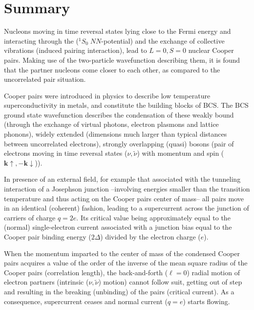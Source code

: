  \section{Summary}
Nucleons moving in time reversal states lying close to the Fermi energy and interacting through the  ($^1S_0\;NN$-potential) and the exchange of collective vibrations (induced pairing interaction), lead to $L=0, S=0$ nuclear Cooper pairs. Making use of the two-particle wavefunction describing them, it is found that the partner nucleons come closer to each other, as compared to the uncorrelated pair situation.

Cooper pairs were introduced in physics to describe low temperature superconductivity in metals, and constitute the building blocks of BCS. The BCS ground state wavefunction describes the condensation of these weakly bound (through the exchange of virtual photons, electron plasmons and lattice phonons), widely extended (dimensions much larger than typical distances between uncorrelated electrons), strongly overlapping (quasi) bosons (pair of electrons moving in time reversal states ($\nu,\tilde \nu$) with momentum and spin ($\mathbf k\uparrow,-\mathbf k\downarrow$)).

In presence of an external field, for example that associated with the tunneling interaction of a Josephson junction --involving energies smaller than the transition temperature and thus acting on the Cooper pairs center of mass-- all pairs move  in an identical (coherent) fashion, leading to a supercurrent across the junction of carriers of charge $q=2e$. Its critical value  being approximately equal to the (normal) single-electron current associated with a junction bias equal to the Cooper pair binding energy ($2\Delta$) divided by the electron charge ($e$).

When the momentum imparted to the center of mass of the condensed Cooper pairs acquires a value of the order of the inverse of the mean square radius of the Cooper pairs (correlation length), the back-and-forth ($\ell=0$) radial motion of electron partners (intrinsic ($\nu,\tilde \nu$) motion) cannot follow suit, getting out of step and resulting in the breaking (unbinding) of the pairs (critical current). As a consequence, supercurrent ceases and  normal current ($q=e$) starts flowing.

